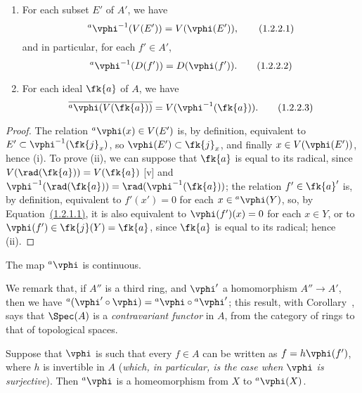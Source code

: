 \begin{prop}[1.2.2]
\label{1.1.2.2}
\medskip\noindent
\begin{enumerate}[label=\emph{(\roman*)}]
  \item For each subset $E'$ of $A'$, we have
    \[
      {}^a\vphi^{-1}(V(E'))=V(\vphi(E')),
      \tag{1.2.2.1}
    \]
    and in particular, for each $f'\in A'$,
    \[
      {}^a\vphi^{-1}(D(f'))=D(\vphi(f')).
      \tag{1.2.2.2}
    \]
  \item For each ideal $\fk{a}$ of $A$, we have
    \[
      \overline{{}^a\vphi(V(\fk{a}))}=V(\vphi^{-1}(\fk{a})).
      \tag{1.2.2.3}
    \]
\end{enumerate}
\end{prop}

\begin{proof}
\label{proof-1.1.2.2}
The relation ${}^a\vphi(x)\in V(E')$ is, by definition, equivalent to $E'\subset\vphi^{-1}(\fk{j}_x)$, so $\vphi(E')\subset\fk{j}_x$, and finally $x\in V(\vphi(E'))$, hence (i).
To prove (ii), we can suppose that $\fk{a}$ is equal to its radical, since $V(\rad(\fk{a}))=V(\fk{a})$ [v] and $\vphi^{-1}(\rad(\fk{a}))=\rad(\vphi^{-1}(\fk{a}))$;
the relation $f'\in\fk{a}'$ is, by definition, equivalent to $f'(x')=0$ for each $x\in{{}^a\vphi(Y)}$, so, by Equation~\hyperref[1.1.2.1]{(1.2.1.1)}, it is also equivalent to $\vphi(f')(x)=0$ for each $x\in Y$, or to $\vphi(f')\in\fk{j}(Y)=\fk{a}$, since $\fk{a}$ is equal to its radical;
hence (ii).
\end{proof}

\begin{cor}[1.2.3]
\label{1.1.2.3}
The map ${}^a\vphi$ is continuous.
\end{cor}

We remark that, if $A''$ is a third ring, and $\vphi'$ a homomorphism $A''\to A'$, then we have ${}^a(\vphi'\circ\vphi)={}^a\vphi\circ{}^a\vphi'$;
this result, with Corollary~, says that $\Spec(A)$ is a \emph{contravariant functor} in $A$, from the category of rings to that of topological spaces.

\begin{cor}[1.2.4]
\label{1.1.2.4}
Suppose that $\vphi$ is such that every $f\in A$ can be written as $f=h\vphi(f')$, where $h$ is invertible in $A$ (\emph{which, in particular, is the case when $\vphi$ is \emph{surjective}}).
Then ${}^a\vphi$ is a homeomorphism from $X$ to ${}^a\vphi(X)$.
\end{cor}

